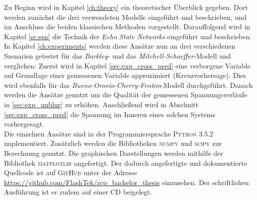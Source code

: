 Zu Beginn wird in Kapitel \ref{ch:theory} ein theoretischer Überblick gegeben. Dort werden zunächst die drei verwendeten Modelle eingeführt und beschrieben, und im Anschluss die beiden klassischen Methoden vorgestellt. Darauffolgend wird in Kapitel \ref{sc:esn} die Technik der \textit{Echo State Networks} eingeführt und beschrieben. In Kapitel \ref{ch:experiments} werden diese Ansätze nun an drei verschiedenen Szenarien getestet für das \textit{Barkley}- und das \textit{Mitchell-Schaeffer}-Modell und verglichen: Zuerst wird in Kapitel \ref{sec:exp_cross_pred} eine verborgene Variable auf Grundlage einer gemessenen Variable approximiert (Kreuzvorhersage). Dies wird ebenfalls für das \textit{Bueno-Orovio-Cherry-Fenton}-Modell durchgeführt. Danach werden die Ansätze genutzt um die Qualität der gemessenen Spannungsverläufe in \ref{sec:exp_unblur} zu erhöhen. Anschließend wird in Abschnitt \ref{sec:exp_cross_pred} die Spannung im Inneren eines solchen Systems vorhergesagt.\\

Die einzelnen Ansätze sind in der Programmiersprache \textsc{Python 3.5.2} implementiert. Zusätzlich werden die Bibliotheken \textsc{numpy} und \textsc{scipy} zur Berechnung genutzt. Die graphischen Darstellungen werden mithilfe der Bibliothek \textsc{matplotlib} angefertigt. Der dadurch angefertigte und dokumentierte Quellcode ist auf \textsc{GitHub} unter der Adresse \href{https://github.com/FlashTek/rcp\_bachelor\_thesis}{https://github.com/FlashTek/rcp\_bachelor\_thesis} einzusehen. Der schriftlichen Ausführung ist er zudem auf einer CD beigelegt.